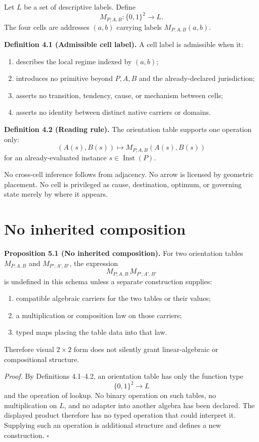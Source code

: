 \documentclass[11pt]{article}
\newcommand{\Inst}{\operatorname{Inst}}
\begin{document}
Let $L$ be a set of descriptive labels. Define
\[
M_{P;A,B}:\{0,1\}^2\longrightarrow L.
\]
The four cells are addresses $(a,b)$ carrying labels $M_{P;A,B}(a,b)$.

\textbf{Definition 4.1 (Admissible cell label).}
A cell label is admissible when it:
\begin{enumerate}
\item describes the local regime indexed by $(a,b)$;
\item introduces no primitive beyond $P,A,B$ and the already-declared jurisdiction;
\item asserts no transition, tendency, cause, or mechanism between cells;
\item asserts no identity between distinct native carriers or domains.
\end{enumerate}

\textbf{Definition 4.2 (Reading rule).}
The orientation table supports one operation only:
\[
\boxed{(A(s),B(s))\longmapsto M_{P;A,B}(A(s),B(s))}
\]
for an already-evaluated instance $s\in\Inst(P)$.

No cross-cell inference follows from adjacency. No arrow is licensed by geometric placement. No cell is privileged as cause, destination, optimum, or governing state merely by where it appears.

\section{No inherited composition}

\textbf{Proposition 5.1 (No inherited composition).}
For two orientation tables $M_{P;A,B}$ and $M_{P';A',B'}$, the expression
\[
M_{P;A,B}\,M_{P';A',B'}
\]
is undefined in this schema unless a separate construction supplies:
\begin{enumerate}
\item compatible algebraic carriers for the two tables or their values;
\item a multiplication or composition law on those carriers;
\item typed maps placing the table data into that law.
\end{enumerate}
Therefore visual $2\times2$ form does not silently grant linear-algebraic or compositional structure.

\textit{Proof.}
By Definitions 4.1--4.2, an orientation table has only the function type
\[
\{0,1\}^2\to L
\]
and the operation of lookup. No binary operation on such tables, no multiplication on $L$, and no adapter into another algebra has been declared. The displayed product therefore has no typed operation that could interpret it. Supplying such an operation is additional structure and defines a new construction. $\square$
\end{document}
